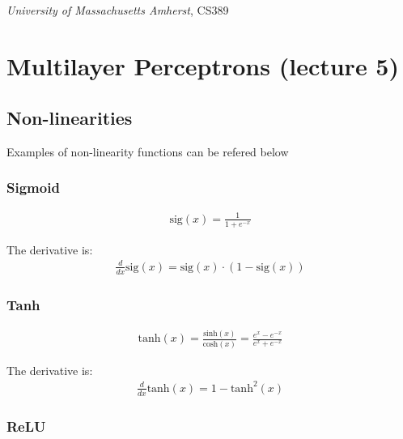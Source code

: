 \documentclass[11pt]{article}
\numberwithin{equation}{section}
\theoremstyle{definition}%
\begin{document}
\noindent
\begin{center}
    \section*{}
    \subsection*{}
    \emph{University of Massachusetts Amherst}, CS389
\end{center}

\section{Multilayer Perceptrons (lecture 5)}

\subsection{Non-linearities}

Examples of non-linearity functions can be refered below

\subsubsection{Sigmoid}

\begin{align}
    \text{sig}(x) = \frac{1}{1+e^{-x}}
\end{align}

The derivative is:
\begin{align}
    \frac{d}{dx}\text{sig}(x) = \text{sig}(x) \cdot (1-\text{sig}(x))
\end{align}

\subsubsection{Tanh}

\begin{align}
    \text{tanh}(x) = \frac{\text{sinh}(x)}{\text{cosh}(x)} = \frac{e^{x}-e^{-x}}{e^{x}+e^{-x}}
\end{align}

The derivative is:
\begin{align}
    \frac{d}{dx} \text{tanh}(x) = 1 - \text{tanh}^{2}(x)
\end{align}

\subsubsection{ReLU}
\end{document}
